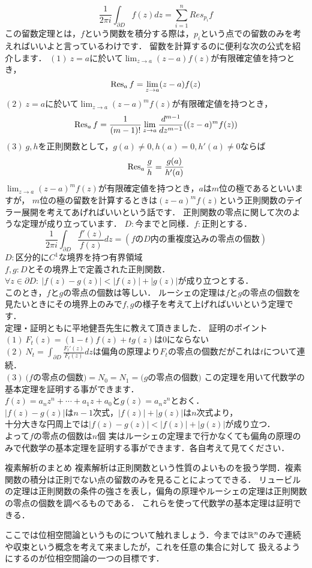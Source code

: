 \[
\frac{1}{2 \pi i}\int_{\partial D} f(z)dz = \sum_{i=1}^n Res_{p_i} f
\]
\thmx
この留数定理とは，$f$という関数を積分する際は，$p_i$という点での留数のみを考えればいいよと言っているわけです．
留数を計算するのに便利な次の公式を紹介します．
\prop
$(1)\ z=a$に於いて$\lim_{z\to a} (z-a)f(z)$が有限確定値を持つとき，
\[
\mathop{\mathrm{Res}}\nolimits_{a} f = \lim_{z\to a} (z-a)f(z)
\]
$(2)\ z=a$に於いて$\lim_{z\to a} (z-a)^m f(z)$が有限確定値を持つとき，
\[
\mathop{\mathrm{Res}}\nolimits_{a} f = \frac{1}{(m-1)!} \lim_{z\to a} \frac{d^{m-1}}{dz^{m-1}} ((z-a)^mf(z))
\]
$(3)\ g,h$を正則関数として，$g(a)\neq 0,h(a)=0,h'(a)\neq 0$ならば
\[
\mathop{\mathrm{Res}}\nolimits_{a} \frac{g}{h} = \frac{g(a)}{h'(a)}
\]
\propx
$\lim_{z\to a} (z-a)^m f(z)$が有限確定値を持つとき，$a$は$m$位の極であるといいますが，
$m$位の極の留数を計算するときは$(z-a)^m f(z)$という正則関数のテイラー展開を考えてあげればいいという話です．
正則関数の零点に関して次のような定理が成り立っています．
\thm[偏角の原理]
$D:$今までと同様．$f:$正則とする．
\[
\frac{1}{2 \pi i} \int_{\partial D} \frac{f'(z)}{f(z)}dz = (f\mbox{の}D\mbox{内の重複度込みの零点の個数})
\]
\thmx
\thm[ルーシェの定理]
$D:$区分的に$C^1$な境界を持つ有界領域\\
$f,g:D$とその境界上で定義された正則関数．\\
$\forall z \in \partial D :\ |f(z)-g(z)|<|f(z)|+|g(z)|$が成り立つとする．\\
このとき，$f$と$g$の零点の個数は等しい．
\thmx
ルーシェの定理は$f$と$g$の零点の個数を見たいときにその境界上のみで$f,g$の様子を考えて上げればいいという定理です．
\proof
\leavevmode\\
定理・証明ともに平地健吾先生に教えて頂きました．
証明のポイント\\
$(1)\ F_t(z) = (1-t) f(z) + t g(z)$は$0$にならない\\
$(2)\ N_t=\int_{\partial D} \frac{F_t'(z)}{F_t(z)}dz$は偏角の原理より$F_t$の零点の個数だがこれは$t$について連続．\\
$(3)\ (f$の零点の個数$)=N_0=N_1=(g$の零点の個数$)$
\proofx
この定理を用いて代数学の基本定理を証明する事ができます．
\proof[ルーシェの定理を用いた代数学の基本定理の証明]
\leavevmode\\

$f(z)=a_n z^n + \cdots + a_1 z+ a_0$と$g(z)=a_n z^n$とおく．\\
$|f(z)-g(z)|$は$n-1$次式，$|f(z)|+|g(z)|$は$n$次式より，\\
十分大きな円周上では$|f(z)-g(z)|<|f(z)|+|g(z)|$が成り立つ．\\
よって$f$の零点の個数は$n$個
\proofx
\prob
実はルーシェの定理まで行かなくても偏角の原理のみで代数学の基本定理を証明する事ができます．各自考えて見てください．
\probx
\begin{itembox}[l]{複素解析のまとめ}
複素解析は正則関数という性質のよいものを扱う学問．複素関数の積分は正則でない点の留数のみを見ることによってできる．
リュービルの定理は正則関数の条件の強さを表し，偏角の原理やルーシェの定理は正則関数の零点の個数を調べるものである．
これらを使って代数学の基本定理は証明できる．
\end{itembox}
ここでは位相空間論というものについて触れましょう．今までは$\mathbb R^n$のみで連続や収束という概念を考えて来ましたが，これを任意の集合に対して
扱えるようにするのが位相空間論の一つの目標です．

